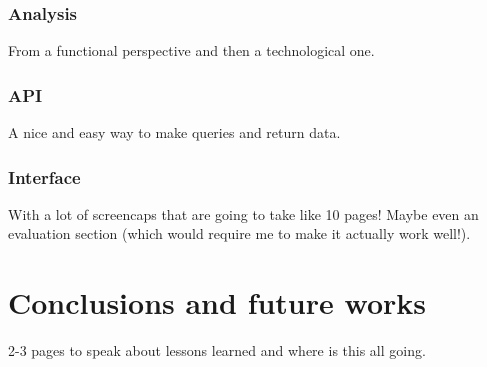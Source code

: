 \documentclass{UniVieCS_PhD} %
\begin{document}
	\subsubsection{Analysis}
	From a functional perspective and then a technological one.
	
	\subsubsection{API}
	A nice and easy way to make queries and return data.
	
	\subsubsection{Interface}
	With a lot of screencaps that are going to take like 10 pages! Maybe even an evaluation section (which would require me to make it actually work well!).
	
	\section{ Conclusions and future works}
	2-3 pages to speak about lessons learned and where is this all going.
	
	\pagebreak
	
	
	
	
\end{document}
